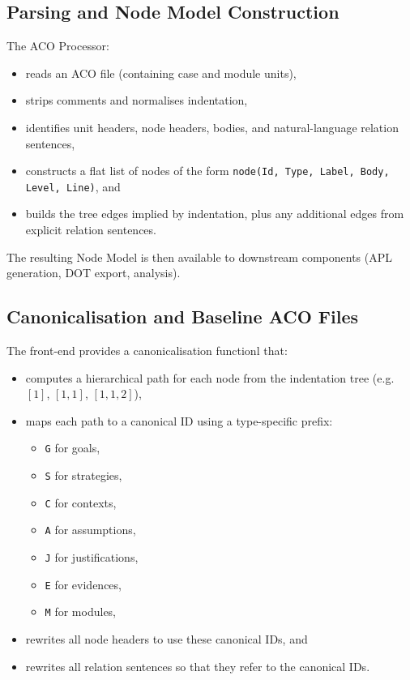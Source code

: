 \documentclass[11pt]{article}
\begin{document}
\subsection{Parsing and Node Model Construction}

The ACO Processor:
\begin{itemize}[leftmargin=2em]
  \item reads an ACO file (containing case and module units),
  \item strips comments and normalises indentation,
  \item identifies unit headers, node headers, bodies, and natural-language relation sentences,
  \item constructs a flat list of nodes of the form
    \texttt{node(Id, Type, Label, Body, Level, Line)}, and
  \item builds the tree edges implied by indentation, plus any additional edges from explicit relation sentences.
\end{itemize}

The resulting Node Model is then available to downstream components (APL generation, DOT export, analysis).

\subsection{Canonicalisation and Baseline ACO Files}

The front-end provides a canonicalisation functionl that:
\begin{itemize}[leftmargin=2em]
  \item computes a hierarchical path for each node from the indentation tree (e.g.\ \([1]\), \([1,1]\), \([1,1,2]\)),
  \item maps each path to a canonical ID using a type-specific prefix:
    \begin{itemize}[leftmargin=1.5em]
      \item \texttt{G} for goals,
      \item \texttt{S} for strategies,
      \item \texttt{C} for contexts,
      \item \texttt{A} for assumptions,
      \item \texttt{J} for justifications,
      \item \texttt{E} for evidences,
      \item \texttt{M} for modules,
    \end{itemize}
  \item rewrites all node headers to use these canonical IDs, and
  \item rewrites all relation sentences so that they refer to the canonical IDs.
\end{itemize}
\end{document}
